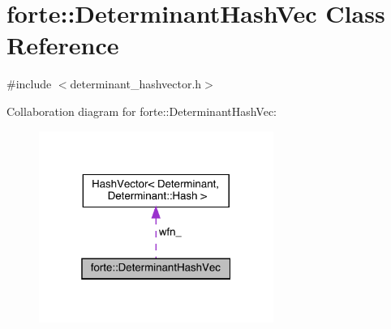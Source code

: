 \hypertarget{classforte_1_1_determinant_hash_vec}{}\section{forte\+:\+:Determinant\+Hash\+Vec Class Reference}
\label{classforte_1_1_determinant_hash_vec}


{\ttfamily \#include $<$determinant\+\_\+hashvector.\+h$>$}



Collaboration diagram for forte\+:\+:Determinant\+Hash\+Vec\+:
\nopagebreak
\begin{figure}[H]
\begin{center}
\leavevmode
\includegraphics[width=217pt]{classforte_1_1_determinant_hash_vec__coll__graph}
\end{center}
\end{figure}

